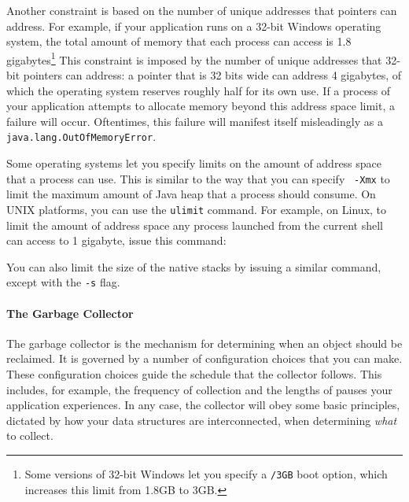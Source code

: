 Another constraint is based on the number of unique addresses that pointers can
address. For example, if your application runs on a 32-bit Windows operating
system, the total amount of memory that each process can access is 1.8
gigabytes\footnote{Some versions of 32-bit Windows let you specify a {\tt /3GB}
boot option, which increases this limit from 1.8GB to 3GB.} This constraint is
imposed by the number of unique addresses that 32-bit pointers can address: a
pointer that is 32 bits wide can address 4 gigabytes, of which the operating
system reserves roughly half for its own use. If a process of your application
attempts to allocate memory beyond this address space limit, a failure will
occur. Oftentimes, this failure will manifest itself misleadingly as a {\tt
java.lang.OutOfMemoryError}.

Some operating systems let you specify limits on the amount of address space
that a process can use. This is similar to the way that you can specify {\tt
-Xmx} to limit the maximum amount of Java heap that a process should consume. On
UNIX platforms, you can use the {\tt ulimit} command. For example, on Linux, to
limit the amount of address space any process launched from the current shell
can access to 1 gigabyte, issue this command:
\begin{shortlisting}
\end{shortlisting}
You can also limit the size of the native stacks by issuing a similar command,
except with the {\tt -s} flag.




\paragraph{The Garbage Collector}
The garbage collector is the mechanism for determining when an object should be
reclaimed. It is governed by a number of configuration choices that you can make.
These configuration choices guide the schedule that the collector follows. This
includes, for example, the frequency of collection and the lengths of pauses your
application experiences. In any case, the collector will obey some basic
principles, dictated by how your data structures are interconnected, when
determining \emph{what} to collect.


